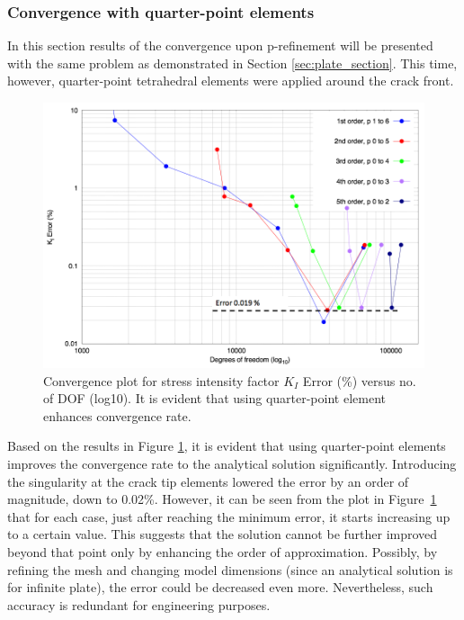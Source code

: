 \documentclass[11pt]{acmeArticle}
\numberwithin{equation}{section}
\begin{document}
\subsubsection{Convergence with quarter-point elements}
In this section results of the convergence upon p-refinement will be presented with the same problem as demonstrated in Section \ref{sec:plate_section}. This time, however, quarter-point tetrahedral elements were applied around the crack front.
\begin{figure}[h!]
	\centering
	\includegraphics[width=0.7\linewidth]{Figures/graphs/plate_conv_singularity.png}
	\caption{Convergence plot for stress intensity factor $K_I$ Error (\%) versus no. of DOF (log10). It is evident that using quarter-point element enhances convergence rate.}
	\label{fig:plate_conv_singularity}
\end{figure}
Based on the results in Figure \ref{fig:plate_conv_singularity}, it is evident that using quarter-point elements improves the convergence rate to the analytical solution significantly. Introducing the singularity at the crack tip elements lowered the error by an order of magnitude, down to 0.02\%. However, it can be seen from the plot in Figure~\ref{fig:plate_conv_singularity} that for each case, just after reaching the minimum error, it starts increasing up to a certain value. This suggests that the solution cannot be further improved beyond that point only by enhancing the order of approximation. Possibly, by refining the mesh and changing model dimensions (since an analytical solution is for infinite plate), the error could be decreased even more. Nevertheless, such accuracy is redundant for engineering purposes. \\ %
\end{document}
